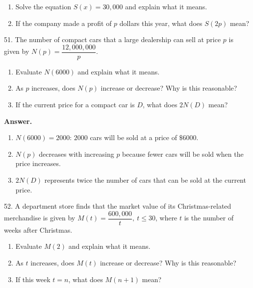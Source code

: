 \documentclass[10pt,]{book}
\theoremstyle{plain}
\theoremstyle{definition}
\theoremstyle{definition}
\theoremstyle{definition}
\theoremstyle{definition}
\numberwithin{equation}{part}
\begin{document}
\begin{exerciselist}
\begin{enumerate}[label=\alph*]
\item\hypertarget{li-460}{}Solve the equation \(S(x) = 30,000\) and explain what it means.%
\item\hypertarget{li-461}{}If the company made a profit of \(p\) dollars this year, what does \(S(2p)\) mean?%
\end{enumerate}
%
\par\smallskip
\item[51.]\hypertarget{exercise-120}{}The number of compact cars that a large dealership can sell at price \(p\) is given by \(N( p) = \dfrac{12,000,000}{p}\). \leavevmode%
\begin{enumerate}[label=\alph*]
\item\hypertarget{li-462}{}Evaluate \(N(6000)\) and explain what it means.%
\item\hypertarget{li-463}{}As \(p\) increases, does \(N(p)\) increase or decrease? Why is this reasonable?%
\item\hypertarget{li-464}{}If the current price for a compact car is \(D\), what does \(2N(D)\) mean?%
\end{enumerate}
%
\par\smallskip
\par\smallskip
\noindent\textbf{Answer.}\hypertarget{answer-69}{}\quad
\leavevmode%
\begin{enumerate}[label=\alph*]
\item\hypertarget{li-465}{}\(N(6000) = 2000\): \(2000\) cars will be sold at a price of \(\$6000\).%
\item\hypertarget{li-466}{}\(N(p)\) decreases with increasing \(p\) because fewer cars will be sold when the price increases.%
\item\hypertarget{li-467}{}\(2N(D)\) represents twice the number of cars that can be sold at the current price.%
\end{enumerate}
%
\item[52.]\hypertarget{exercise-121}{}A department store finds that the market value of its Christmas-related merchandise is given by \(M(t) = \dfrac{600,000}{t},~ t\le 30\), where \(t\) is the number of weeks after Christmas. \leavevmode%
\begin{enumerate}[label=\alph*]
\item\hypertarget{li-468}{}Evaluate \(M(2)\) and explain what it means.%
\item\hypertarget{li-469}{}As \(t\) increases, does \(M(t)\) increase or decrease? Why is this reasonable?%
\item\hypertarget{li-470}{}If this week \(t = n\), what does \(M(n + 1)\) mean?%

\end{enumerate}
\end{exerciselist}
\end{document}
